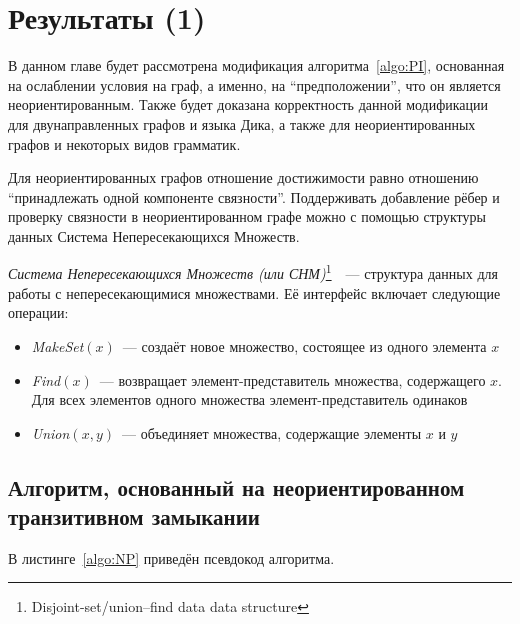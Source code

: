 \section{Результаты (1)}\label{section:bidirected}

В данном главе будет рассмотрена модификация алгоритма~\ref{algo:PI}, основанная на ослаблении условия на граф, а именно, на ``предположении'', что он является неориентированным. Также будет доказана корректность данной модификации для двунаправленных графов и языка Дика, а также для неориентированных графов и некоторых видов грамматик.

Для неориентированных графов отношение достижимости равно отношению ``принадлежать одной компоненте связности''. Поддерживать добавление рёбер и проверку связности в неориентированном графе можно с помощью структуры данных Система Непересекающихся Множеств. 

\begin{definition}
  \textit{Система Непересекающихся Множеств (или СНМ)}\footnote{Disjoint-set/union–find data data structure}~\cite{Galler1964}~--- структура данных для работы с непересекающимися множествами. Её интерфейс включает следующие операции:
  \vspace{-\topsep}
  \begin{itemize}
    \setlength\itemsep{-0.1em}
    \item \textit{MakeSet}$(x)$~--- создаёт новое множество, состоящее из одного элемента $x$
    \item \textit{Find}$(x)$~--- возвращает элемент-представитель множества, содержащего $x$. Для всех элементов одного множества элемент-представитель одинаков
    \item \textit{Union}$(x, y)$~--- объединяет множества, содержащие элементы $x$ и $y$
  \end{itemize}
\end{definition}

\subsection{Алгоритм, основанный на неориентированном транзитивном замыкании}

В листинге~\ref{algo:NP} приведён псевдокод алгоритма.


